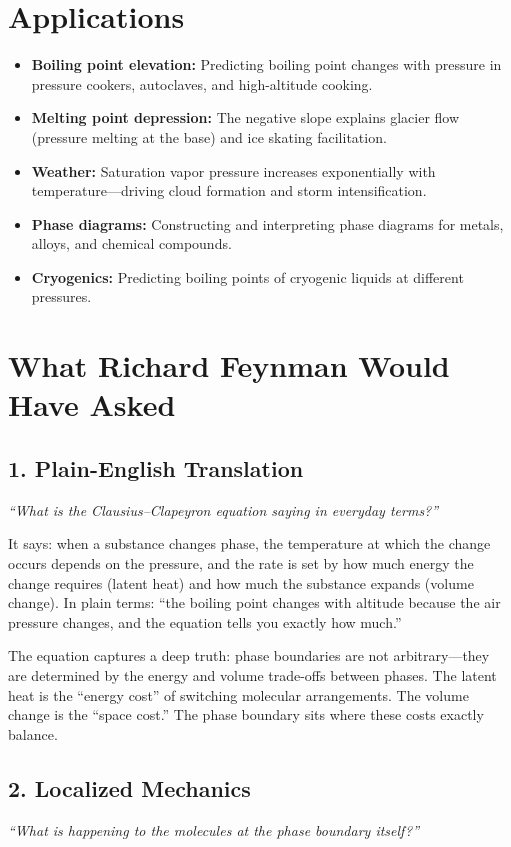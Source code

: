 \documentclass[11pt,openright]{book}
\begin{document}
\section*{Applications}

\begin{itemize}
\item \textbf{Boiling point elevation:} Predicting boiling point changes with pressure in pressure cookers, autoclaves, and high-altitude cooking.
\item \textbf{Melting point depression:} The negative slope explains glacier flow (pressure melting at the base) and ice skating facilitation.
\item \textbf{Weather:} Saturation vapor pressure increases exponentially with temperature---driving cloud formation and storm intensification.
\item \textbf{Phase diagrams:} Constructing and interpreting phase diagrams for metals, alloys, and chemical compounds.
\item \textbf{Cryogenics:} Predicting boiling points of cryogenic liquids at different pressures.
\end{itemize}
\section*{What Richard Feynman Would Have Asked}

\subsection*{1. Plain-English Translation}
\textit{``What is the Clausius--Clapeyron equation saying in everyday terms?''}

It says: when a substance changes phase, the temperature at which the change occurs depends on the pressure, and the rate is set by how much energy the change requires (latent heat) and how much the substance expands (volume change). In plain terms: ``the boiling point changes with altitude because the air pressure changes, and the equation tells you exactly how much.''

The equation captures a deep truth: phase boundaries are not arbitrary---they are determined by the energy and volume trade-offs between phases. The latent heat is the ``energy cost'' of switching molecular arrangements. The volume change is the ``space cost.'' The phase boundary sits where these costs exactly balance.

\subsection*{2. Localized Mechanics}
\textit{``What is happening to the molecules at the phase boundary itself?''}
\end{document}
